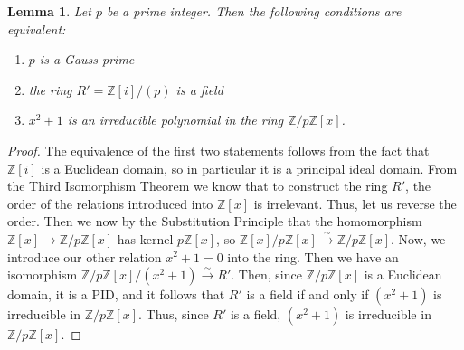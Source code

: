 \documentclass[12pt]{article}
\newtheorem{lem}[thm]{Lemma}  %
\theoremstyle{definition}
\theoremstyle{remark}
\numberwithin{equation}{section}
\newcommand\Z{\mathbb Z}    %
\begin{document}
\begin{lem}
        Let $p$ be a prime integer. Then the following conditions are equivalent: \begin{enumerate}
                \item $p$ is a Gauss prime
                \item the ring $R' = \Z[i]/(p)$ is a field
                \item $x^2+1$ is an irreducible polynomial in the ring $\Z/p\Z[x]$.
        \end{enumerate}
\end{lem}
\begin{proof}
        The equivalence of the first two statements follows from the fact that $\Z[i]$ is a Euclidean domain, so in particular it is a principal ideal domain. From the Third Isomorphism Theorem we know that to construct the ring $R'$, the order of the relations introduced into $\Z[x]$ is irrelevant. Thus, let us reverse the order. Then we now by the Substitution Principle that the homomorphism $\Z[x] \rightarrow \Z/p\Z[x]$ has kernel $p\Z[x]$, so $\Z[x]/p\Z[x] \xrightarrow{\sim} \Z/p\Z[x]$. Now, we introduce our other relation $x^2+1 = 0$ into the ring. Then we have an isomorphism $\Z/p\Z[x]/(x^2+1) \xrightarrow{\sim}R'$. Then, since $\Z/p\Z[x]$ is a Euclidean domain, it is a PID, and it follows that $R'$ is a field if and only if $(x^2+1)$ is irreducible in $\Z/p\Z[x]$. Thus, since $R'$ is a field, $(x^2+1)$ is irreducible in $\Z/p\Z[x]$.
\end{proof}

\vspace{15pt}
\end{document}
